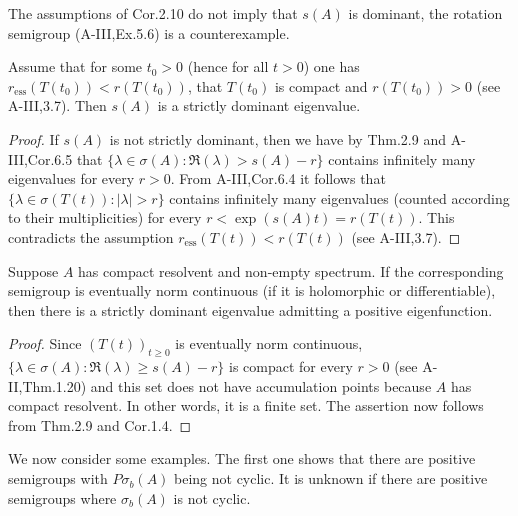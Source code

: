 The assumptions of Cor.2.10 do not imply that $s(A)$ is dominant, the rotation semigroup (A-III,Ex.5.6) is a counterexample.
\begin{corollary}\label{cor:b3-2.11}
	Assume that for some $t_{0} > 0$ (hence for all $t > 0$) one has $r_{\text{ess}}(T(t_{0})) < r(T(t_{0}))$, \eg that $T(t_{0})$ is compact and $r(T(t_{0})) > 0$ (see A-III,3.7).
	Then $s(A)$ is a strictly dominant eigenvalue.
\end{corollary}
%
%	
\begin{proof}
	If $s(A)$ is not strictly dominant, then we have by Thm.2.9 and A-III,Cor.6.5 that $\{\lambda \in \sigma(A) \colon \Re(\lambda) > s(A) - r\}$ contains infinitely many eigenvalues for every $r > 0$.
	From A-III,Cor.6.4 it follows that $\{\lambda \in \sigma(T(t)) \colon |\lambda| > r\}$ contains infinitely many eigenvalues (counted according to their multiplicities) for every $r < \exp(s(A)t) = r(T(t))$.
	This contradicts the assumption $r_{\text{ess}}(T(t)) < r(T(t))$ (see A-III,3.7).
\end{proof}
\begin{corollary}\label{cor:b3-2.12}
	Suppose $A$ has compact resolvent and non-empty spectrum.
	If the corresponding semigroup is eventually norm continuous (\eg if it is holomorphic or differentiable), then there is a strictly dominant eigenvalue admitting a positive eigenfunction.
\end{corollary}
\begin{proof}
	Since $(T(t))_{t \geq 0}$ is eventually norm continuous, $\{\lambda \in \sigma(A) \colon \Re(\lambda) \geq s(A)-r\}$ is compact for every $r > 0$ (see A-II,Thm.1.20) and this set does not have accumulation points because $A$ has compact resolvent.
	In other words, it is a finite set.
	The assertion now follows from Thm.2.9 and Cor.1.4.
\end{proof}
We now consider some examples. 
The first one shows that there are positive semigroups with $P\sigma_{b}(A)$ being not cyclic.
It is unknown if there are positive semigroups where $\sigma_{b}(A)$ is not cyclic.
